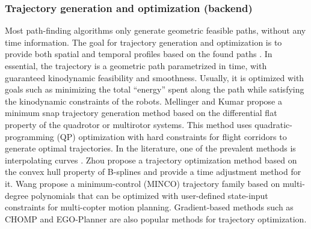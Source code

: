 \documentclass[letterpaper,journal,twoside]{IEEEtran}
\begin{document}
\subsubsection{Trajectory generation and optimization (backend)}
Most path-finding algorithms only generate geometric 
feasible paths, without any time information. 
The goal for trajectory generation and optimization is to 
provide both spatial and temporal profiles based on the 
found paths \cite{quan2020survey}. 
In essential, the trajectory is a geometric path parametrized 
in time, with guaranteed kinodynamic feasibility and smoothness.
Usually, it is optimized with goals such as minimizing the 
total ``energy'' spent along the path while satisfying the 
kinodynamic constraints of the robots.
Mellinger and Kumar \cite{mellinger2011minimum} propose 
a minimum snap trajectory generation method based on the 
differential flat property of the quadrotor or multirotor 
systems. 
This method uses quadratic-programming (QP) optimization with 
hard constraints for flight corridors to generate optimal 
trajectories. 
In the literature, one of the prevalent methods is 
interpolating curves \cite{dong2023review}.
Zhou \etal \cite{zhou2019robust} propose a trajectory 
optimization method based on the convex hull property of 
B-splines and provide a time adjustment method for it.
Wang \etal \cite{wang2022geometrically} propose a 
minimum-control (MINCO) trajectory family based on 
multi-degree polynomials that can be 
optimized with user-defined state-input constraints for 
multi-copter motion planning.
Gradient-based methods such as
CHOMP \cite{ratliff2009chomp} and 
EGO-Planner \cite{zhou2020ego} are also popular methods 
for trajectory optimization.
\end{document}

